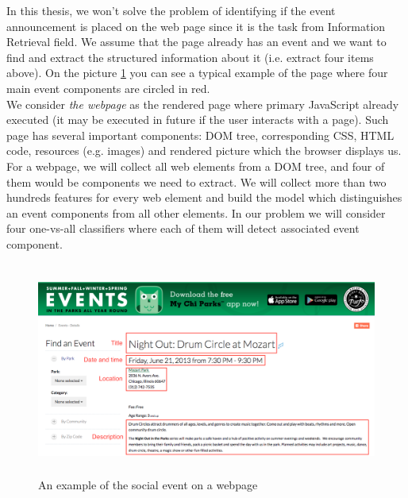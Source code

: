 In this thesis, we won't solve the problem of identifying if the event announcement is placed on the web page since it is the task from Information Retrieval field. We assume that the page already has an event and we want to find and extract the structured information about it (i.e. extract four items above). On the picture \ref{fig:webevent} you can see a typical example of the page where four main event components are circled in red.\\

We consider \textit{the webpage} as the rendered page where primary JavaScript already executed (it may be executed in future if the user interacts with a page). Such page has several important components: DOM tree, corresponding CSS, HTML code, resources (e.g. images) and rendered picture which the browser displays us. \\

For a webpage, we will collect all web elements from a DOM tree, and four of them would be components we need to extract. We will collect more than two hundreds features for every web element and build the model which distinguishes an event components from all other elements. In our problem we will consider four one-vs-all classifiers where each of them will detect associated event component. 

\begin{figure}[h]
\begin{center}
\includegraphics[height=7cm]{figures01/event_example}
\caption{An example of the social event on a webpage}
\label{fig:webevent}
\end{center}
\end{figure}


